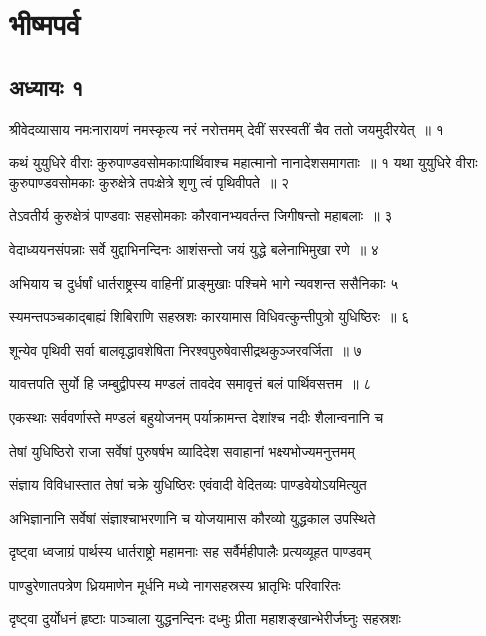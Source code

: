 \part{भीष्मपर्व}
\chapter{अध्यायः १}
\twolineshloka
{श्रीवेदव्यासाय नमःनारायणं नमस्कृत्य नरं नरोत्तमम्}
{देवीं सरस्वतीं चैव ततो जयमुदीरयेत् ॥ १}


कथं युयुधिरे वीराः कुरुपाण्डवसोमकाःपार्थिवाश्च महात्मानो नानादेशसमागताः ॥ १
\twolineshloka
{यथा युयुधिरे वीराः कुरुपाण्डवसोमकाः}
{कुरुक्षेत्रे तपःक्षेत्रे शृणु त्वं पृथिवीपते ॥ २}


\twolineshloka
{तेऽवतीर्य कुरुक्षेत्रं पाण्डवाः सहसोमकाः}
{कौरवानभ्यवर्तन्त जिगीषन्तो महाबलाः ॥ ३}


\twolineshloka
{वेदाध्ययनसंपन्नाः सर्वे युद्दाभिनन्दिनः}
{आशंसन्तो जयं युद्धे बलेनाभिमुखा रणे ॥ ४}


\twolineshloka
{अभियाय च दुर्धर्षां धार्तराष्ट्रस्य वाहिनीं}
{प्राङ्मुखाः पश्चिमे भागे न्यवशन्त ससैनिकाः ५}


\twolineshloka
{स्यमन्तपञ्चकाद्बाह्यं शिबिराणि सहस्रशः}
{कारयामास विधिवत्कुन्तीपुत्रो युधिष्ठिरः ॥ ६}


\twolineshloka
{शून्येव पृथिवी सर्वा बालवृद्धावशेषिता}
{निरश्वपुरुषेवासीद्रथकुञ्जरवर्जिता ॥ ७}


\twolineshloka
{यावत्तपति सुर्यो हि जम्बुद्वीपस्य मण्डलं}
{तावदेव समावृत्तं बलं पार्थिवसत्तम ॥ ८}


\twolineshloka
{एकस्थाः सर्ववर्णास्ते मण्डलं बहुयोजनम्}
{पर्याक्रामन्त देशांश्च नदीः शैलान्वनानि च}


\twolineshloka
{तेषां युधिष्ठिरो राजा सर्वेषां पुरुषर्षभ}
{व्यादिदेश सवाहानां भक्ष्यभोज्यमनुत्तमम्}


\twolineshloka
{संज्ञाय विविधास्तात तेषां चक्रे युधिष्ठिरः}
{एवंवादी वेदितव्यः पाण्डवेयोऽयमित्युत}


\twolineshloka
{अभिज्ञानानि सर्वेषां संज्ञाश्चाभरणानि च}
{योजयामास कौरव्यो युद्धकाल उपस्थिते}


\twolineshloka
{दृष्ट्वा ध्वजाग्रं पार्थस्य धार्तराष्ट्रो महामनाः}
{सह सर्वैर्महीपालैः प्रत्यव्यूहत पाण्डवम्}


\twolineshloka
{पाण्डुरेणातपत्रेण ध्रियमाणेन मूर्धनि}
{मध्ये नागसहस्रस्य भ्रातृभिः परिवारितः}


\twolineshloka
{दृष्ट्वा दुर्योधनं हृष्टाः पाञ्चाला युद्धनन्दिनः}
{दध्मुः प्रीता महाशङ्खान्भेरीर्जघ्नुः सहस्रशः}


